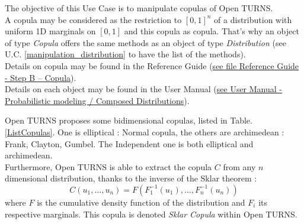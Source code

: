 \renewcommand{\filename}{docUC_InputNoData_Copula}
\renewcommand{\filetitle}{UC : Creation of a copula and a composed copula}

\HeaderIIILevel








The objective of this Use Case is to manipulate copulas of Open TURNS.\\

A copula may be considered as the restriction to $[0,1]^n$ of a distribution with uniform 1D marginals on $[0,1]$ and this copula as copula. That's why an object of type {\itshape Copula} offers the same methods as an object of type {\itshape Distribution} (see U.C. \ref{manipulation_distribution} to have the list of the methods).\\

Details on copula may be found in the Reference Guide (\href{OpenTURNS_ReferenceGuide.pdf}{see file Reference Guide - Step B -- Copula}).\\

Details on each object may be found in the User Manual  (\href{OpenTURNS_UserManual_TUI.pdf}{see User Manual - Probabilistic modeling / Composed Distributions}).\\




Open TURNS proposes some bidimensional copulas, listed in Table. \ref{ListCopulas}. One is elliptical : Normal copula, the others are archimedean : Frank, Clayton, Gumbel. The Independent one is both elliptical and archimedean.\\


Furthermore, Open TURNS is able to extract the copula $C$ from any $n$ dimensional distribution, thanks to the inverse of the Sklar theorem :
$$
C(u_1, \dots, u_n) = F(F_1^{-1}(u_1), \dots, F_n^{-1}(u_n))
$$
where $F$ is the cumulative density function of the distribution and $F_i$ its respective marginals. This copula is denoted \emph{Sklar Copula} within Open TURNS.\\


